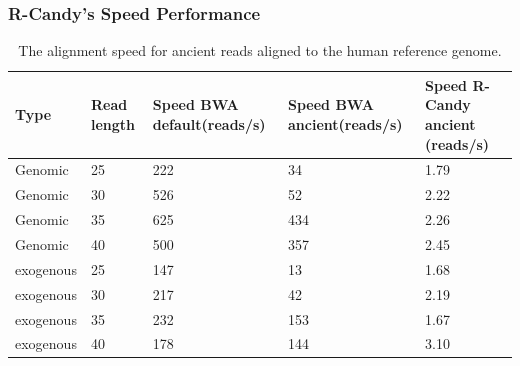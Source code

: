 \documentclass{beamer}
\begin{document}
\begin{frame}[shrink=15]
\frametitle{R-Candy's Speed Performance}

\begin{table}[H]
  \begin{tabular}{ |p{2cm} |p{2cm} |p{2cm} |p{2cm} |p{2cm} | }
    \hline
	\footnotesize
  	\textbf{Type} 
  	&\textbf{\footnotesize Read length }
  	&\textbf{\footnotesize Speed BWA default\hspace{15pt}(reads/s) }
  	&\textbf{\footnotesize Speed BWA ancient\hspace{15pt}(reads/s)} 
  	&\textbf{\footnotesize Speed R-Candy ancient (reads/s)}\\ 
  	  \hline
 	  Genomic    & 25  & 222 &  34   &  1.79 \\ \hline
      Genomic    & 30  & 526 &  52   &  2.22 \\ \hline
      Genomic    & 35  & 625 &  434   &  2.26 \\ \hline
 	  Genomic	 & 40  & 500 &  357   &  2.45 \\ \hline
 	  exogenous  & 25  & 147 &  13   &  1.68 \\ \hline
      exogenous  & 30  & 217 &  42   &  2.19 \\ \hline
 	  exogenous  & 35  & 232 &  153   &  1.67 \\ \hline
 	  exogenous  & 40  & 178 &  144   &  3.10 \\ \hline
   \end{tabular}
{\caption*{The alignment speed for ancient reads aligned to 
the human reference genome.}}
\label{speed-RG}
\end{table}


\end{frame}
\end{document}
